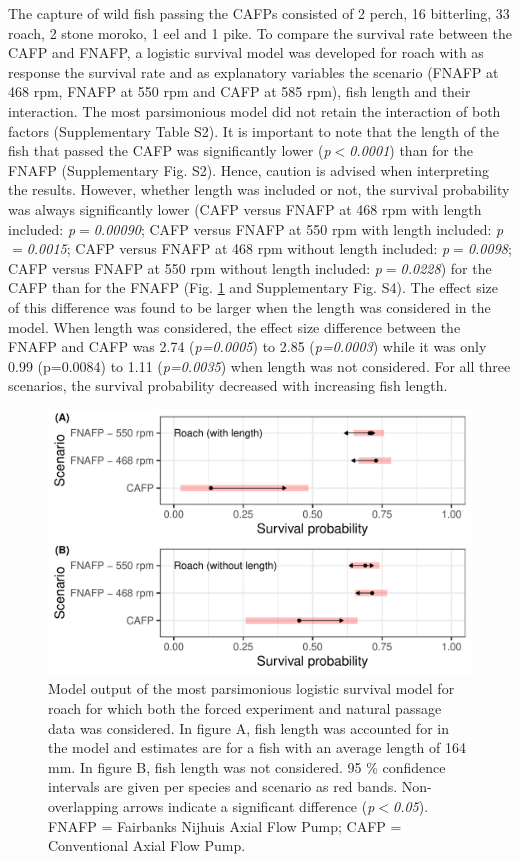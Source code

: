 \documentclass[fleqn,10pt]{wlscirep}
\begin{document}
The capture of wild fish passing the CAFPs consisted of 2 perch, 16 bitterling, 33 roach, 2 stone moroko, 1 eel and 1 pike. To compare the survival rate between the CAFP and FNAFP, a logistic survival model was developed for roach with as response the survival rate and as explanatory variables the scenario (FNAFP at 468 rpm, FNAFP at 550 rpm and CAFP at 585 rpm), fish length and their interaction. The most parsimonious model did not retain the interaction of both factors (Supplementary Table S2). It is important to note that the length of the fish that passed the CAFP was significantly lower (\textit{p$<$0.0001}) than for the FNAFP (Supplementary Fig. S2). Hence, caution is advised when interpreting the results. However, whether length was included or not, the survival probability was always significantly lower (CAFP versus FNAFP at 468 rpm with length included: \textit{p$=$0.00090};  CAFP versus FNAFP at 550 rpm with length included: \textit{p$=$0.0015}; CAFP versus FNAFP at 468 rpm without length included: \textit{p$=$0.0098};  CAFP versus FNAFP at 550 rpm without length included: \textit{p$=$0.0228}) for the CAFP than for the FNAFP (Fig. \ref{fig:log_model_CI_natural_with_and_without_length} and Supplementary Fig. S4). The effect size of this difference was found to be larger when the length was considered in the model. When length was considered, the effect size difference between the FNAFP and CAFP was 2.74 (\textit{p=0.0005}) to 2.85 (\textit{p=0.0003}) while it was only 0.99 (p=0.0084) to 1.11 (\textit{p=0.0035}) when length was not considered. For all three scenarios, the survival probability decreased with increasing fish length. 

\begin{figure}[ht]
  \centering
  \includegraphics[scale=0.65]{log_model_CI_natural_with_and_without_length}
  \caption{Model output of the most parsimonious logistic survival model for roach for which both the forced experiment and natural passage data was considered. In figure A, fish length was accounted for in the model and estimates are for a fish with an average length of 164 mm. In figure B, fish length was not considered. 95 \% confidence intervals are given per species and scenario as red bands. Non-overlapping arrows indicate a significant difference (\textit{p$<$0.05}). FNAFP = Fairbanks Nijhuis Axial Flow Pump; CAFP = Conventional Axial Flow Pump.}
  \label{fig:log_model_CI_natural_with_and_without_length}
\end{figure}
\end{document}
